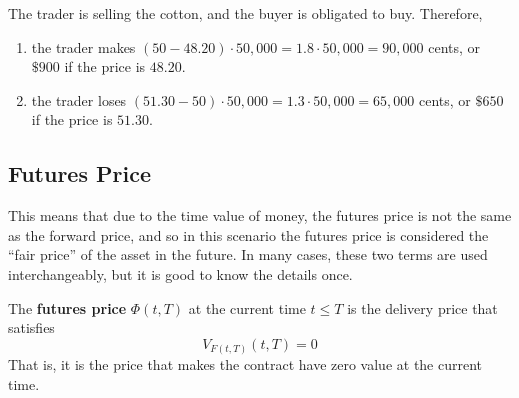 \documentclass{article}
\begin{document}
      \begin{solution}[Hull 1.6]
        The trader is selling the cotton, and the buyer is obligated to buy. Therefore, 
        \begin{enumerate}
          \item the trader makes $(50 - 48.20) \cdot 50,000 = 1.8 \cdot 50,000 = 90,000$ cents, or $\$900$ if the price is $48.20$. 
          \item the trader loses $(51.30 - 50) \cdot 50,000 = 1.3 \cdot 50,000 = 65,000$ cents, or $\$650$ if the price is $51.30$.
        \end{enumerate}
      \end{solution}

  \subsection{Futures Price}

    This means that due to the time value of money, the futures price is not the same as the forward price, and so in this scenario the futures price is considered the ``fair price'' of the asset in the future. In many cases, these two terms are used interchangeably, but it is good to know the details once. 

    \begin{definition}
      The \textbf{futures price} $\Phi(t, T)$ at the current time $t \leq T$ is the delivery price that satisfies 
      \begin{equation}
        V_{F(t, T)} (t, T) = 0
      \end{equation}
      That is, it is the price that makes the contract have zero value at the current time.
    \end{definition}
\end{document}
